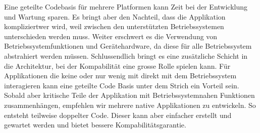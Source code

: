 Eine geteilte Codebasis für mehrere Platformen kann Zeit bei der Entwicklung und Wartung sparen.
Es bringt aber den Nachteil, dass die Applikation kompliziertwer wird, weil zwischen den unterstützten Betriebssystemen unterschieden werden muss.
Weiter erschwert es die Verwendung von Betriebssystemfunktionen und Gerätehardware, da diese für alle Betriebssystem abstrahiert werden müssen.
Schlussendlich bringt es eine zusätzliche Schicht in die Architektur, bei der Kompabilität eine grosse Rolle spielen kann.
Für Applikationen die keine oder nur wenig mit direkt mit dem Betriebssystem interagieren kann eine geteilte Code Basis unter dem Strich ein Vorteil sein.
Sobald aber kritische Teile der Applikation mit Betriebssystemnahen Funktionen zusammenhängen, empfehlen wir mehrere native Applikationen zu entwickeln.
So entsteht teilweise doppelter Code.
Dieser kann aber einfacher erstellt und gewartet werden und bietet bessere Kompabilitätsgarantie.

\clearpage
